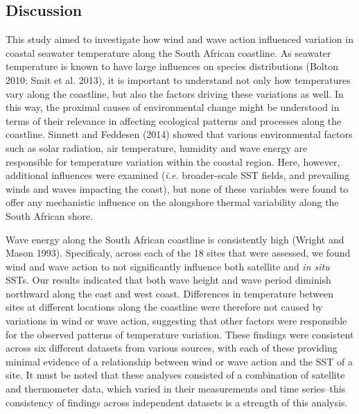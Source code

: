 \documentclass[10pt,a4paper,]{article}
\begin{document}
\hypertarget{discussion}{%
\subsection{Discussion}\label{discussion}}

This study aimed to investigate how wind and wave action influenced
variation in coastal seawater temperature along the South African
coastline. As seawater temperature is known to have large influences on
species distributions (Bolton 2010; Smit et al. 2013), it is important
to understand not only how temperatures vary along the coastline, but
also the factors driving these variations as well. In this way, the
proximal causes of environmental change might be understood in terms of
their relevance in affecting ecological patterns and processes along the
coastline. Sinnett and Feddesen (2014) showed that various environmental
factors such as solar radiation, air temperature, humidity and wave
energy are responsible for temperature variation within the coastal
region. Here, however, additional influences were examined (\emph{i.e.}
broader-scale SST fields, and prevailing winds and waves impacting the
coast), but none of these variables were found to offer any mechanistic
influence on the alongshore thermal variability along the South African
shore.

Wave energy along the South African coastline is consistently high
(Wright and Mason 1993). Specificaly, across each of the 18 sites that
were assessed, we found wind and wave action to not significantly
influence both satellite and \emph{in situ} SSTs. Our results indicated
that both wave height and wave period diminish northward along the east
and west coast. Differences in temperature between sites at different
locations along the coastline were therefore not caused by variations in
wind or wave action, suggesting that other factors were responsible for
the observed patterns of temperature variation. These findings were
consistent across six different datasets from various sources, with each
of these providing minimal evidence of a relationship between wind or
wave action and the SST of a site. It must be noted that these analyses
consisted of a combination of satellite and thermometer data, which
varied in their measurements and time series--this consistency of
findings across independent datasets is a strength of this analysis.
\end{document}
